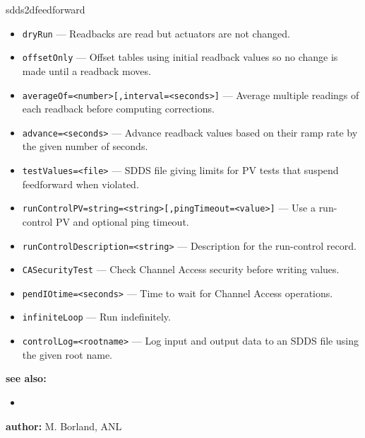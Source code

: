 \begin{sddsprog}{sdds2dfeedforward}
\begin{itemize}
        \item {\tt dryRun} --- Readbacks are read but actuators are not changed.
        \item {\tt offsetOnly} --- Offset tables using initial readback values so
               no change is made until a readback moves.
        \item {\tt averageOf=<number>[,interval=<seconds>]} --- Average multiple
               readings of each readback before computing corrections.
        \item {\tt advance=<seconds>} --- Advance readback values based on their
               ramp rate by the given number of seconds.
        \item {\tt testValues=<file>} --- SDDS file giving limits for PV tests that
               suspend feedforward when violated.
        \item {\tt runControlPV=string=<string>[,pingTimeout=<value>]} --- Use a
               run-control PV and optional ping timeout.
        \item {\tt runControlDescription=<string>} --- Description for the
               run-control record.
        \item {\tt CASecurityTest} --- Check Channel Access security before
               writing values.
        \item {\tt pendIOtime=<seconds>} --- Time to wait for Channel Access
               operations.
        \item {\tt infiniteLoop} --- Run indefinitely.
        \item {\tt controlLog=<rootname>} --- Log input and output data to an
               SDDS file using the given root name.
    \end{itemize}
\item \textbf{see also:}
  \begin{itemize}
    \item {}
  \end{itemize}
\item \textbf{author:} M. Borland, ANL
\end{sddsprog}

